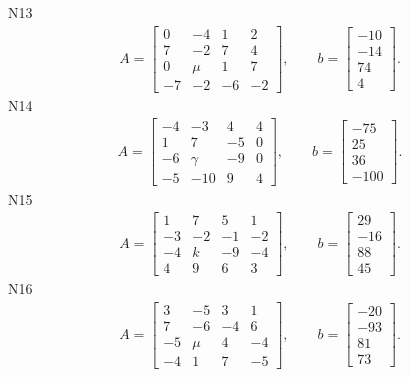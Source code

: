 \documentclass[11pt]{report}
\begin{document}
N13
\begin{align*}
 A = \left[\begin{matrix}0 & -4 & 1 & 2\\7 & -2 & 7 & 4\\0 & \mu & 1 & 7\\-7 & -2 & -6 & -2\end{matrix}\right],
\qquad b = \left[\begin{matrix}-10\\-14\\74\\4\end{matrix}\right]. 
 \end{align*}
N14
\begin{align*}
 A = \left[\begin{matrix}-4 & -3 & 4 & 4\\1 & 7 & -5 & 0\\-6 & \gamma & -9 & 0\\-5 & -10 & 9 & 4\end{matrix}\right],
\qquad b = \left[\begin{matrix}-75\\25\\36\\-100\end{matrix}\right]. 
 \end{align*}
N15
\begin{align*}
 A = \left[\begin{matrix}1 & 7 & 5 & 1\\-3 & -2 & -1 & -2\\-4 & k & -9 & -4\\4 & 9 & 6 & 3\end{matrix}\right],
\qquad b = \left[\begin{matrix}29\\-16\\88\\45\end{matrix}\right]. 
 \end{align*}
N16
\begin{align*}
 A = \left[\begin{matrix}3 & -5 & 3 & 1\\7 & -6 & -4 & 6\\-5 & \mu & 4 & -4\\-4 & 1 & 7 & -5\end{matrix}\right],
\qquad b = \left[\begin{matrix}-20\\-93\\81\\73\end{matrix}\right]. 
 \end{align*}
\end{document}
